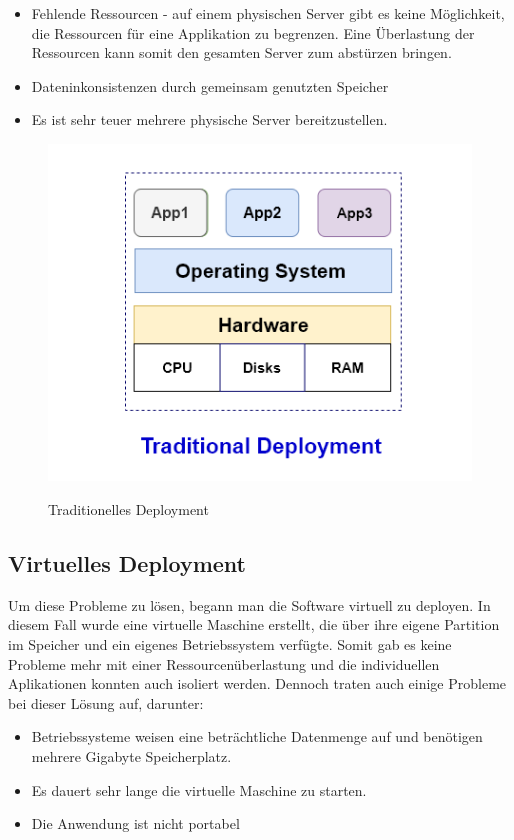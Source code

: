 \begin{itemize}
    \item Fehlende Ressourcen - auf einem physischen Server gibt es keine Möglichkeit, die Ressourcen für eine Applikation zu begrenzen. Eine Überlastung der Ressourcen kann somit den gesamten Server zum abstürzen bringen.
    \item Dateninkonsistenzen durch gemeinsam genutzten Speicher
    \item Es ist sehr teuer mehrere physische Server bereitzustellen.
\end{itemize}

\begin{figure}[h]
    \centering
    \includegraphics[width=0.7\linewidth]{pics/traditionelles-deployment.png}
    \caption{Traditionelles Deployment}
    \label{fig:enter-label}
    \cite{traditional_grafik}
\end{figure}


\cite{Traditional_vs_Container_vs_Virtuell_Deployment}

\subsection{Virtuelles Deployment}
Um diese Probleme zu lösen, begann man die Software virtuell zu deployen. In diesem Fall wurde eine virtuelle Maschine erstellt, die über ihre eigene Partition im Speicher und ein eigenes Betriebssystem verfügte. Somit gab es keine Probleme mehr mit einer Ressourcenüberlastung und die individuellen Aplikationen konnten auch isoliert werden. Dennoch traten auch einige Probleme bei dieser Lösung auf, darunter:

\begin{itemize}
\item Betriebssysteme weisen eine beträchtliche Datenmenge auf und benötigen mehrere Gigabyte Speicherplatz.
\item Es dauert sehr lange die virtuelle Maschine zu starten.
\item  Die Anwendung ist nicht portabel
\end{itemize}

